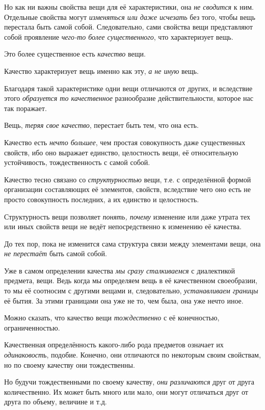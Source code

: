 \documentclass[a4paper,14pt,russian]{extreport}
\begin{document}
Но как ни важны свойства вещи для её характеристики, она \emph{не сводится} к ним. Отдельные свойства могут \emph{изменяться или даже исчезать} без того, чтобы вещь перестала быть самой собой. Следовательно, сами свойства вещи представляют собой проявление \emph{чего-то более существенного}, что характеризует вещь.

Это более существенное есть \emph{качество} вещи.

Качество характеризует вещь именно как эту, \emph{а не иную} вещь.

Благодаря такой характеристике одни вещи отличаются от других, и вследствие этого \emph{образуется то качественное} разнообразие действительности, которое нас так поражает.

Вещь, \emph{теряя свое качество}, перестает быть тем, что она есть.

Качество есть \emph{нечто большее}, чем простая совокупность даже существенных свойств, ибо оно выражает единство, целостность вещи, её относительную устойчивость, тождественность с самой собой.

Качество тесно связано со \emph{структурностью} вещи, т.е. с определённой формой организации составляющих её элементов, свойств, вследствие чего оно есть не просто совокупность последних, а их единство и целостность.

Структурность вещи позволяет \emph{понять, почему} изменение или даже утрата тех или иных свойств вещи не ведёт непосредственно к изменению её качества.

До тех пор, пока не изменится сама структура связи между элементами вещи, она \emph{не перестаёт} быть самой собой.

Уже в самом определении качества \emph{мы сразу сталкиваемся} с диалектикой предмета, вещи. Ведь когда мы определяем вещь в её качественном своеобразии, то мы её соотносим с другими вещами и, следовательно, \emph{устанавливаем границы} её бытия. За этими границами она уже не то, чем была, она уже нечто иное.

Можно сказать, что качество вещи \emph{тождественно} с её конечностью, ограниченностью.

Качественная определённость какого-либо рода предметов означает их \emph{одинаковост}ь, подобие. Конечно, они отличаются по некоторым своим свойствам, но по своему качеству они тождественны.

Но будучи тождественными по своему качеству, \emph{они различаются} друг от друга количественно. Их может быть много или мало, они могут отличаться друг от друга по объему, величине и т.д.
\end{document}
